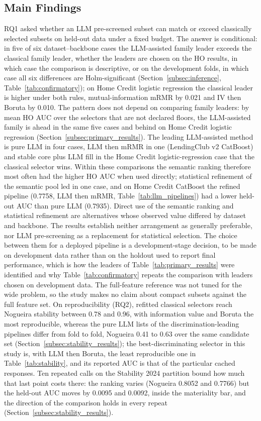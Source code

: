 \documentclass[final,5p,twocolumn]{elsarticle}
\begin{document}
\subsection{Main Findings}
\label{subsec:main_findings}

RQ1 asked whether an LLM pre-screened subset can match or exceed classically selected subsets on held-out data under a fixed budget. The answer is conditional: in five of six dataset--backbone cases the LLM-assisted family leader exceeds the classical family leader, whether the leaders are chosen on the HO results, in which case the comparison is descriptive, or on the development folds, in which case all six differences are Holm-significant (Section~\ref{subsec:inference}, Table~\ref{tab:confirmatory}); on Home Credit logistic regression the classical leader is higher under both rules, mutual-information mRMR by 0.021 and IV then Boruta by 0.010. The pattern does not depend on comparing family leaders: by mean HO AUC over the selectors that are not declared floors, the LLM-assisted family is ahead in the same five cases and behind on Home Credit logistic regression (Section~\ref{subsec:primary_results}). The leading LLM-assisted method is pure LLM in four cases, LLM then mRMR in one (LendingClub v2 CatBoost) and stable core plus LLM fill in the Home Credit logistic-regression case that the classical selector wins. Within these comparisons the semantic ranking therefore most often had the higher HO AUC when used directly; statistical refinement of the semantic pool led in one case, and on Home Credit CatBoost the refined pipeline (0.7758, LLM then mRMR, Table~\ref{tab:llm_pipelines}) had a lower held-out AUC than pure LLM (0.7935). Direct use of the semantic ranking and statistical refinement are alternatives whose observed value differed by dataset and backbone. The results establish neither arrangement as generally preferable, nor LLM pre-screening as a replacement for statistical selection. The choice between them for a deployed pipeline is a development-stage decision, to be made on development data rather than on the holdout used to report final performance, which is how the leaders of Table~\ref{tab:primary_results} were identified and why Table~\ref{tab:confirmatory} repeats the comparison with leaders chosen on development data. The full-feature reference was not tuned for the wide problem, so the study makes no claim about compact subsets against the full feature set. On reproducibility (RQ2), refitted classical selectors reach Nogueira stability between 0.78 and 0.96, with information value and Boruta the most reproducible, whereas the pure LLM lists of the discrimination-leading pipelines differ from fold to fold, Nogueira 0.41 to 0.63 over the same candidate set (Section~\ref{subsec:stability_results}); the best-discriminating selector in this study is, with LLM then Boruta, the least reproducible one in Table~\ref{tab:stability}, and its reported AUC is that of the particular cached responses. Ten repeated calls on the Stability 2024 partition bound how much that last point costs there: the ranking varies (Nogueira 0.8052 and 0.7766) but the held-out AUC moves by 0.0095 and 0.0092, inside the materiality bar, and the direction of the comparison holds in every repeat (Section~\ref{subsec:stability_results}).
\end{document}
